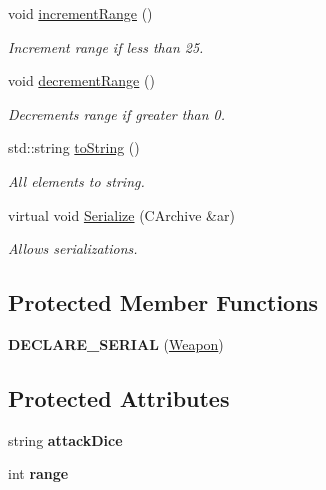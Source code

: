 \begin{DoxyCompactItemize}
\hypertarget{class_weapon_a7dd6eff2cc572adb9bef4b985a255920}{}\label{class_weapon_a7dd6eff2cc572adb9bef4b985a255920} 
void \hyperlink{class_weapon_a7dd6eff2cc572adb9bef4b985a255920}{increment\+Range} ()
\begin{DoxyCompactList}\small\item\em Increment range if less than 25. \end{DoxyCompactList}\item 
\hypertarget{class_weapon_a6e28001720b8f43ee74f0ac7d3008ba5}{}\label{class_weapon_a6e28001720b8f43ee74f0ac7d3008ba5} 
void \hyperlink{class_weapon_a6e28001720b8f43ee74f0ac7d3008ba5}{decrement\+Range} ()
\begin{DoxyCompactList}\small\item\em Decrements range if greater than 0. \end{DoxyCompactList}\item 
\hypertarget{class_weapon_af1e10f75793cadcaec54a2ff96879312}{}\label{class_weapon_af1e10f75793cadcaec54a2ff96879312} 
std\+::string \hyperlink{class_weapon_af1e10f75793cadcaec54a2ff96879312}{to\+String} ()
\begin{DoxyCompactList}\small\item\em All elements to string. \end{DoxyCompactList}\item 
\hypertarget{class_weapon_a1c30e8f2add0a1aa8558cfbff13ad728}{}\label{class_weapon_a1c30e8f2add0a1aa8558cfbff13ad728} 
virtual void \hyperlink{class_weapon_a1c30e8f2add0a1aa8558cfbff13ad728}{Serialize} (C\+Archive \&ar)
\begin{DoxyCompactList}\small\item\em Allows serializations. \end{DoxyCompactList}\end{DoxyCompactItemize}
\subsection*{Protected Member Functions}
\begin{DoxyCompactItemize}
\item 
\hypertarget{class_weapon_acccf5cf3803e3ab7f63490e0d49c9abe}{}\label{class_weapon_acccf5cf3803e3ab7f63490e0d49c9abe} 
{\bfseries D\+E\+C\+L\+A\+R\+E\+\_\+\+S\+E\+R\+I\+AL} (\hyperlink{class_weapon}{Weapon})
\end{DoxyCompactItemize}
\subsection*{Protected Attributes}
\begin{DoxyCompactItemize}
\item 
\hypertarget{class_weapon_a034430020bc2fefd021253b49014c334}{}\label{class_weapon_a034430020bc2fefd021253b49014c334} 
string {\bfseries attack\+Dice}
\item 
\hypertarget{class_weapon_a13cc71a89d0cf076f58a040767682478}{}\label{class_weapon_a13cc71a89d0cf076f58a040767682478} 
int {\bfseries range}
\end{DoxyCompactItemize}


